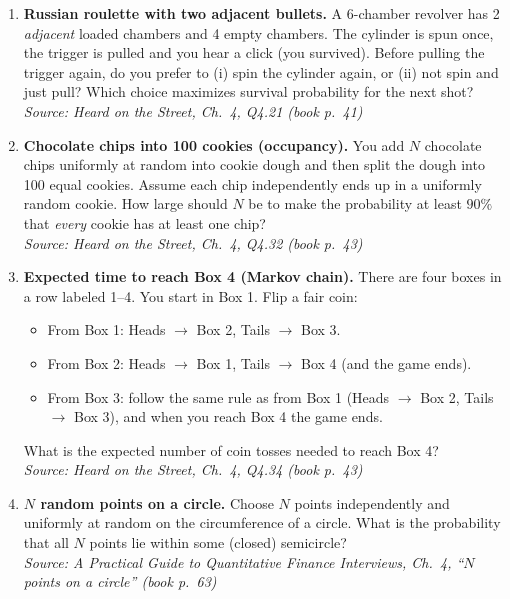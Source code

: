 \documentclass[11pt]{article}
\begin{document}
\begin{enumerate}[label=\textbf{\arabic*.}, resume]

\item \textbf{Russian roulette with two adjacent bullets.}
A 6-chamber revolver has 2 \emph{adjacent} loaded chambers and 4 empty chambers.
The cylinder is spun once, the trigger is pulled and you hear a click (you survived).
Before pulling the trigger again, do you prefer to (i) spin the cylinder again, or (ii) not spin and just pull?
Which choice maximizes survival probability for the next shot?\\
\hfill{\small\textit{Source: Heard on the Street, Ch.\ 4, Q4.21 (book p.\ 41)}}

\item \textbf{Chocolate chips into 100 cookies (occupancy).}
You add $N$ chocolate chips uniformly at random into cookie dough and then split the dough into 100 equal cookies.
Assume each chip independently ends up in a uniformly random cookie.
How large should $N$ be to make the probability at least $90\%$ that \emph{every} cookie has at least one chip?\\
\hfill{\small\textit{Source: Heard on the Street, Ch.\ 4, Q4.32 (book p.\ 43)}}

\item \textbf{Expected time to reach Box 4 (Markov chain).}
There are four boxes in a row labeled 1--4. You start in Box 1.
Flip a fair coin:
\begin{itemize}[nosep]
\item From Box 1: Heads $\to$ Box 2, Tails $\to$ Box 3.
\item From Box 2: Heads $\to$ Box 1, Tails $\to$ Box 4 (and the game ends).
\item From Box 3: follow the same rule as from Box 1 (Heads $\to$ Box 2, Tails $\to$ Box 3), and when you reach Box 4 the game ends.
\end{itemize}
What is the expected number of coin tosses needed to reach Box 4?\\
\hfill{\small\textit{Source: Heard on the Street, Ch.\ 4, Q4.34 (book p.\ 43)}}

\item \textbf{$N$ random points on a circle.}
Choose $N$ points independently and uniformly at random on the circumference of a circle.
What is the probability that all $N$ points lie within some (closed) semicircle?\\
\hfill{\small\textit{Source: A Practical Guide to Quantitative Finance Interviews, Ch.\ 4, ``$N$ points on a circle'' (book p.\ 63)}}


\end{enumerate}
\end{document}
